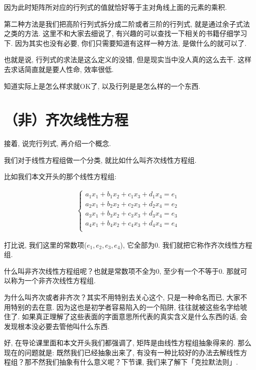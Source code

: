 因为此时矩阵所对应的行列式的值就恰好等于主对角线上面的元素的乘积. 

第二种方法是我们把高阶行列式拆分成二阶或者三阶的行列式, 就是通过余子式法之类的方法. 这里不和大家去细说了, 有兴趣的可以查找一下相关的书籍仔细学习下. 因为其实也没有必要, 你们只需要知道有这样一种方法, 是做什么的就可以了. 

也就是说, 行列式的求法是这么定义的没错, 但是现实当中没人真的这么去干. 这样去求话简直就是要人性命, 效率很低. 

知道实际上是怎么样求就OK了, 以及行列是是怎么样的一个东西. 

\section{（非）齐次线性方程}

接着, 说完行列式, 再介绍一个概念. 

我们对于线性方程组做一个分类, 就比如什么叫齐次线性方程组. 

比如我们本文开头的那个线性方程组: 

\begin{align*}
\begin{cases}
  a_1x_1 + b_1x_2+ c_1x_3 + d_1x_4 = e_1 \\
  a_2x_1 + b_2x_2+ c_2x_3 + d_2x_4 = e_2 \\
  a_3x_1 + b_3x_2+ c_3x_3 + d_3x_4 = e_3 \\
  a_4x_1 + b_4x_2+ c_4x_3 + d_4x_4 = e_4 \\
\end{cases}
\end{align*}

打比说, 我们这里的常数项($e_1, e_2, e_3, e_4$),  它全部为0. 我们就把它称作齐次线性方程组. 

什么叫非齐次线性方程组呢？也就是常数项不全为0, 至少有一个不等于0. 那就可以称为一个非齐次线性方程组. 

为什么叫齐次或者非齐次？其实不用特别去关心这个, 只是一种命名而已, 大家不用特别的去在意. 因为这也是初学者容易陷入的一个陷阱, 往往就被这些名字给唬住了. 如果真正理解了这些表面的字面意思所代表的真实含义是什么东西的话, 会发现根本没必要去管他叫什么东西. 

好, 在导论课里面和本文开头我们都强调了, 矩阵是由线性方程组抽象得来的. 那么现在的问题就是: 既然我们已经抽象出来了, 有没有一种比较好的办法去解线性方程组？那不然我们抽象有什么意义呢？下节课, 我们来了解下「克拉默法则」. 